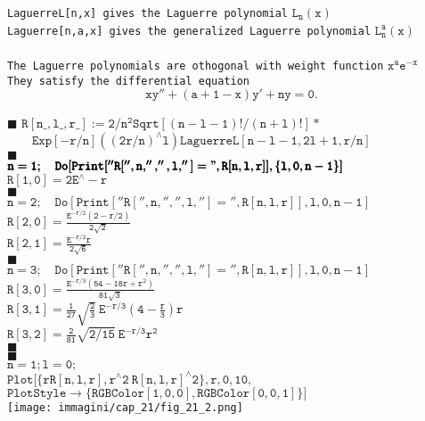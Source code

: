 \noindent\texttt{LaguerreL[n,x] gives the Laguerre polynomial} $\mathtt{L_n (x)}$\\
\texttt{Laguerre[n,a,x] gives the generalized Laguerre polynomial} $\mathtt{L_ n ^a(x)}$\\
\\
\noindent \texttt{The Laguerre polynomials are othogonal with weight function} $\mathtt{x^a e^{-x}}$\\
\texttt{They satisfy the differential equation}
\[ \mathtt{xy'' +(a+1-x)y'+ny=0.}\]

$\blacksquare$ $\mathtt{ R[n\_, l\_, r\_]:= 2/n^2Sqrt[ (n-l-1)!/(n+l)!]*}$\\
\hspace*{1cm} $\qquad\mathtt{Exp[-r/n]((2r/n)^{\wedge}l)LaguerreL[n-l-1,2l+1,r/n]}$\\

$\blacksquare$ \textbf{}\\

\noindent$\pmb{\mathtt{n=1;\quad Do[Print[''R['',n,'','',l,'']=",R[n,l,r]],\{l,0,n-1\}]}}$\\
$\mathtt{R[1,0]=2 E^{\wedge}-r}$\\

$\blacksquare$ \textbf{}\\

\noindent $\pmb{\mathtt{n=2;\quad Do[Print[''R['',n,'','',l,'']='',R[n,l,r]],{l,0,n-1}]}}$\\
$\mathtt{\displaystyle{R[2,0]=\frac{E^{-r/2} (2-r/2)}{2\sqrt{2}}}}$\\
$\mathtt{\displaystyle{R[2,1]=\frac{E^{-r/2} r}{2 \sqrt{6}}}}$\\

$\blacksquare$ \textbf{}\\
\noindent $\pmb{\mathtt{n=3; \quad 
Do[Print[''R['',n,'','',l,'']='',R[n,l,r]],{l,0,n-1}]}}$\\
$\mathtt{\displaystyle{R[3,0]=\frac{E^{-r/3} (54-18 r+r^2)}{81 \sqrt{3}}}}$\\
$\mathtt{\displaystyle{R[3,1]=\frac{1}{27} \sqrt{\frac{2}{3}}\ E^{-r/3} \left(4-\frac{r}{3}\right) r}}$\\
$\mathtt{\displaystyle{R[3,2]=\frac{2}{81} \sqrt{2/15}\ E^{-r/3} r^2}}$\\
\newpage
$\blacksquare$ \textbf{\large{}}\\

$\blacksquare$ \textbf{}\\
$\pmb{\mathtt{n=1;l=0;}}$\\
$\pmb{\mathtt{Plot[\{r R[n,l,r], r^{\wedge}2\ R[n,l,r]^{\wedge}2\},{r,0,10},}}$\\
\hspace*{1cm}$\pmb{\mathtt{PlotStyle\rightarrow \{ RGBColor[1,0,0],RGBColor[0,0,1]\}]}}$\\
\texttt{[image: immagini/cap\_21/fig\_21\_2.png]}\\


